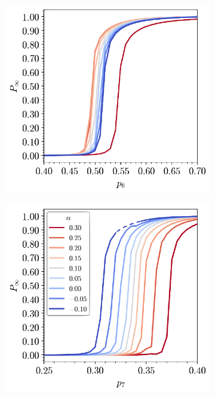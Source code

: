 \begin{figure}[bt]
     \centering
     
     \begin{subfigure}[b]{0.45\textwidth}
         \centering
         \includegraphics[width=\textwidth]{./figures/targeted_opt/perc1.pdf}
         \caption{}
         \label{fig:percres1}
     \end{subfigure}
     \hfill
      \begin{subfigure}[b]{0.45\textwidth}
         \centering
         \includegraphics[width=\textwidth]{./figures/targeted_opt/perc2.pdf}
         \caption{}
         \label{fig:percres2}
     \end{subfigure}
     \hfill
     

\end{figure}

